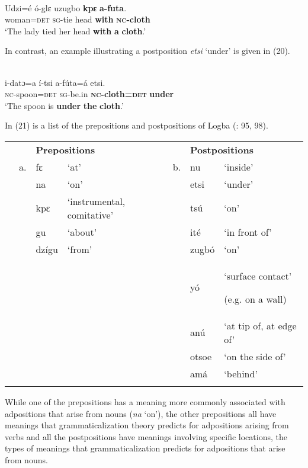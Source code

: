 \documentclass[output=paper]{langsci/langscibook}
\begin{document}
\ea\label{ex:dryer:}
\\
\gll Udzi=é  ó-glɛ  uzugbo  \textbf{kpɛ}  \textbf{a-futa}.\\
       woman=\textsc{det}  \textsc{sg}{}-tie  head  \textbf{with}  \textbf{\textsc{nc}}\textbf{{}-cloth}  \\
\glt ‘The lady tied her head \textbf{with} \textbf{a} \textbf{cloth}.’  
\z

In contrast, an example illustrating a postposition \textit{etsi} ‘under’ is given in (20).

\ea\label{ex:dryer:}
\\
\gll i-datɔ=a  í-tsi  a-fúta=á  etsi.\\
       \textsc{nc}{}-spoon=\textsc{det}  \textsc{sg}{}-be.in  \textbf{\textsc{nc}}\textbf{{}-cloth=}\textbf{\textsc{det}}  \textbf{under}\\
\glt   ‘The spoon is \textbf{under} \textbf{the} \textbf{cloth}.’ 
\z

In (21) is a list of the prepositions and postpositions of Logba (\citealt{Dorvlo2008}: 95, 98).


\begin{table}
\begin{tabularx}{\textwidth}{XXXXXXX} &  & \multicolumn{2}{X}{\bfseries Prepositions} &  & \multicolumn{2}{X}{\bfseries Postpositions}\\
\lsptoprule
& a. & fɛ & ‘at’ & b. & nu & ‘inside’\\
&  & na & ‘on’ &  & etsi & ‘under’\\
&  & kpɛ & ‘instrumental, comitative’ &  & tsú & ‘on’\\
&  & gu & ‘about’ &  & ité & ‘in front of’\\
&  & dzígu & ‘from’ &  & zugbó & ‘on’\\
&  &  &  &  & yó & {‘surface contact’}

(e.g. on a wall)\\
&  &  &  &  & anú & ‘at tip of, at edge of’\\
&  &  &  &  & otsoe & ‘on the side of’\\
&  &  &  &  & amá & ‘behind’\\
\lspbottomrule
\end{tabularx}
\end{table}


While one of the prepositions has a meaning more commonly associated with adpositions that arise from nouns (\textit{na} ‘on’), the other prepositions all have meanings that grammaticalization theory predicts for adpositions arising from verbs and all the postpositions have meanings involving specific locations, the types of meanings that grammaticalization predicts for adpositions that arise from nouns.
\end{document}
